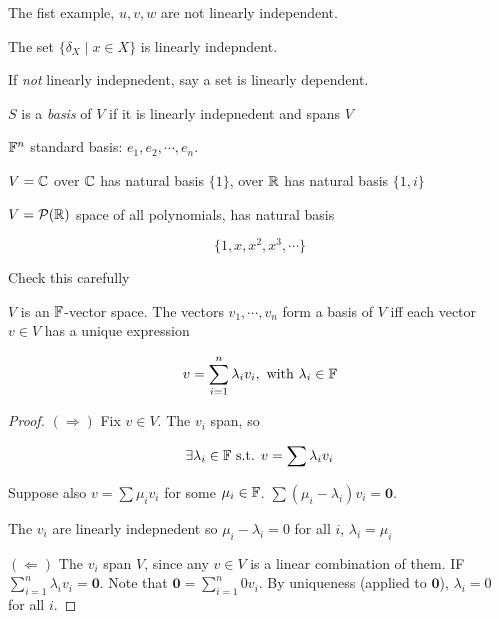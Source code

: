 \documentclass[a4paper]{article}
\begin{document}
\begin{eg}
	The fist example, $ u,v,w $ are not linearly independent.
	
\end{eg}

\begin{eg}
	The set $ \{  \delta_{X} \; | \; x \in X \} $ is linearly indepndent.
\end{eg}


\begin{defi}
	If \emph{not} linearly indepnedent, say a set is linearly dependent.
\end{defi}

\begin{defi}
	$ S $ is a \emph{basis} of $ V $ if it is linearly indepnedent and spans $ V $
\end{defi}


\begin{eg}
	$ \mathbb{F}^{n}  $  standard basis: $ e_{1},e_{2},\cdots,e_{n} $.
\end{eg}

\begin{eg}
	$ V = \mathbb{C} $ over $ \mathbb{C} $ has natural basis $ \{ 1\} $, over $ \mathbb{R} $ has natural basis $ \{ 1,i \} $
\end{eg}


\begin{eg}
	$ V = \mathcal{P}(\mathbb{R}) $ space of all polynomials, has natural basis 
	
	\[ \{ 1,x,x^{2},x^{3},\cdots \} \]
\end{eg}

\begin{ex}
	Check this carefully 
\end{ex}


\begin{lemma} 
	$ V $ is an $ \mathbb{F} $-vector space. The vectors $ v_{1}, \cdots, v_{n} $ form a basis of $ V $ iff each vector $ v \in V $ has a unique expression
	
	\[ v = \sum_{i=1}^{n} \lambda_{i}v_{i}, \text{ with } \lambda_{i} \in \mathbb{F} \] 
	
\end{lemma}

\begin{proof}
	$ (\Rightarrow) $ Fix $ v \in V$. The $ v_{i} $ span, so 
	
	\[ \exists \lambda_{i} \in \mathbb{F} \text{ s.t. } v = \sum \lambda_{i} v_{i} \]
	
	Suppose also $ v = \sum \mu_{i} v_{i} $ for some $ \mu_{i} \in \mathbb{F} $. $ \sum \left( \mu_{i} - \lambda_{i} \right)  v_{i} = \mathbf{0} $.
	
	The $ v_{i} $ are linearly indepnedent so $ \mu_{i} - \lambda_{i} = 0 $ for all $ i $, $ \lambda_{i} = \mu_{i} $
	
	
	$ (\Leftarrow) $ The $ v_{i} $ span $ V $, since any $ v \in V $ is a linear combination of them.
	IF $ \sum_{i=1}^{n} \lambda_{i} v_{i} = \mathbf{0} $. Note that $ \mathbf{0} = \sum_{i=1}^{n} 0 v_{i} $. By uniqueness (applied to $ \mathbf{0} $), $ \lambda_{i}  = 0 $ for all $ i $. 
\end{proof} 
\end{document}
